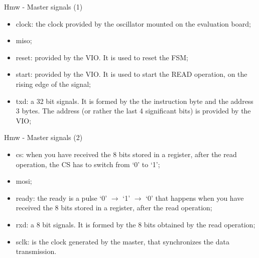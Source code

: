 \documentclass[ignorenonframetext,aspectratio=43,]{beamer}
\begin{document}
\begin{frame}{Hmw - Master signals (1)}
\protect\hypertarget{hmw---master-signals-1}{}

\begin{itemize}
\item
  clock: the clock provided by the oscillator mounted on the evaluation
  board;
\item
  miso;
\item
  reset: provided by the VIO. It is used to reset the FSM;
\item
  start: provided by the VIO. It is used to start the READ operation, on
  the rising edge of the signal;
\item
  txd: a 32 bit signals. It is formed by the the instruction byte and
  the address 3 bytes. The address (or rather the last 4 significant
  bits) is provided by the VIO;
\end{itemize}

\end{frame}

\begin{frame}{Hmw - Master signals (2)}
\protect\hypertarget{hmw---master-signals-2}{}

\begin{itemize}
\item
  cs: when you have received the 8 bits stored in a register, after the
  read operation, the CS has to switch from `0' to `1';
\item
  mosi;
\item
  ready: the ready is a pulse `0' \(\rightarrow\) `1' \(\rightarrow\)
  `0' that happens when you have received the 8 bits stored in a
  register, after the read operation;
\item
  rxd: a 8 bit signals. It is formed by the 8 bits obtained by the read
  operation;
\item
  sclk: is the clock generated by the master, that synchronizes the data
  transmission.
\end{itemize}

\end{frame}
\end{document}
